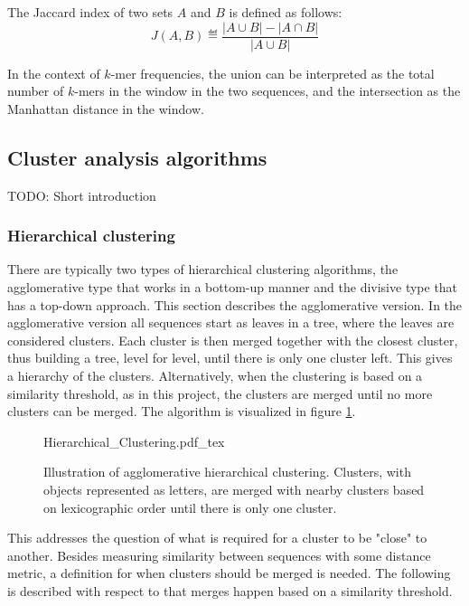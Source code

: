 The Jaccard index of two sets $A$ and $B$ is defined as follows:
\begin{equation}
  J(A, B) \eqdef \frac{|A \cup B| - |A \cap B|}{|A \cup B|}
\end{equation}

In the context of $k$-mer frequencies, the union can be interpreted as the
total number of $k$-mers in the window in the two sequences, and the
intersection as the Manhattan distance in the window.


\subsection{Cluster analysis algorithms}

TODO: Short introduction

\subsubsection{Hierarchical clustering}

There are typically two types of hierarchical clustering algorithms, the
agglomerative type that works in a bottom-up manner and the divisive type that
has a top-down approach. This section describes the agglomerative version. In
the agglomerative version all sequences start as leaves in a tree, where the
leaves are considered clusters. Each cluster is then merged together with the
closest cluster, thus building a tree, level for level, until there is only one
cluster left. This gives a hierarchy of the clusters. Alternatively, when the
clustering is based on a similarity threshold, as in this project, the clusters
are merged until no more clusters can be merged. The algorithm is visualized in
figure \ref{fig:hierarchical_clustering}.

\begin{figure}[h!]
  \centering
  \def\svgwidth{\columnwidth}
  {Hierarchical_Clustering.pdf_tex}
  \caption{Illustration of agglomerative hierarchical clustering. Clusters,
    with objects represented as letters, are merged with nearby clusters based
    on lexicographic order until there is only one cluster.}
  \label{fig:hierarchical_clustering}
\end{figure}

This addresses the question of what is required for a cluster to be "close" to
another. Besides measuring similarity between sequences with some distance
metric, a definition for when clusters should be merged is needed. The 
following is described with respect to that merges happen based on a similarity threshold.

